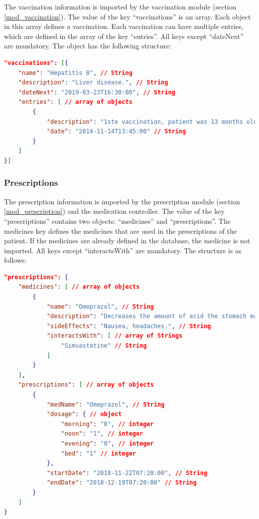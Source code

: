     The vaccination information is imported by the vaccination module (section
    \ref{mod_vaccination}). The value of the key ``vaccinations'' is an array. Each object in this array defines a vaccination. Each vaccination can have multiple entries, which are defined in the array of the key ``entries''. All keys except ``dateNext'' are mandatory. The object has the following structure:

\begin{lstlisting}[language=json,firstnumber=1]
"vaccinations": [{
    "name": "Hepatitis B", // String
    "description": "Liver disease.", // String
    "dateNext": "2019-03-23T16:30:00", // String
    "entries": [ // array of objects
        {
            "description": "1ste vaccination, patient was 13 months old.", // String
            "date": "2014-11-14T13:45:00" // String
        }
    ]
}]
\end{lstlisting}

    \subsubsection{Prescriptions}

    The prescription information is imported by the prescription module (section
    \ref{mod_prescription}) and the medication controller. The value of the key ``prescriptions'' contains two objects: ``medicines'' and ``prescriptions''. The medicines key defines the medicines that are used in the prescriptions of the patient. If the medicines are already defined in the database, the medicine is not imported. All keys except ``interactsWith'' are mandatory. The structure is as follows:

\begin{lstlisting}[language=json,firstnumber=1]
"prescriptions": {
    "medicines": [ // array of objects
        {
            "name": "Omeprazol", // String
            "description": "Decreases the amount of acid the stomach makes.", // String
            "sideEffects": "Nausea, headaches.", // String
            "interactsWith": [ // array of Strings
                "Simvastatine" // String
            ]
        }
    ],
    "prescriptions": [ // array of objects
        {
            "medName": "Omeprazol", // String
            "dosage": { // object
                "morning": "0", // integer
                "noon": "1", // integer
                "evening": "0", // integer
                "bed": "1" // integer
            },
            "startDate": "2018-11-22T07:20:00", // String
            "endDate": "2018-12-19T07:20:00" // String
        }
    ]
}
\end{lstlisting}

